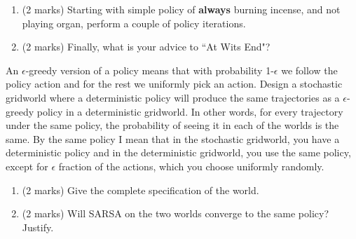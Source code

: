 \documentclass[addpoints,12pt,solution]{exam}
\begin{document}
\begin{questions}
\begin{enumerate}[label=(\alph*)]
\begin{solution}


\end{solution}

\item (2 marks) Starting with simple policy of \textbf{always} burning incense, and not playing organ, perform a couple of policy iterations.

\begin{solution}


\end{solution}

\item (2 marks) Finally, what is your advice to ``At Wits End"?

\begin{solution}


\end{solution}


\end{enumerate}

 An $\epsilon$-greedy version of a policy means that with probability 1-$\epsilon$ we follow the policy action and for the rest we uniformly pick an action.
Design a stochastic gridworld where a deterministic policy will produce
the same trajectories as a $\epsilon$-greedy policy in a deterministic
gridworld. In other words, for every trajectory under the same policy, the
probability of seeing it in each of the worlds is the same. By the same policy I mean that in the stochastic gridworld, you have a deterministic policy and in the
deterministic gridworld, you use the same policy, except for $\epsilon$ fraction of the actions, which you choose uniformly randomly.

\begin{enumerate}[label=(\alph*)]

\item (2 marks) Give the complete specification of the world.

\begin{solution}


\end{solution}


\item (2 marks) Will SARSA on the two worlds converge to the same policy? Justify.

\begin{solution}

\end{solution}


\end{enumerate}
\end{questions}
\end{document}
